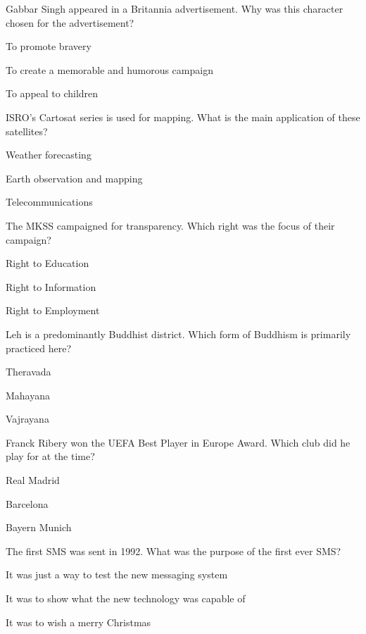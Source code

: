 \begin{enhancedmcq}{Gabbar Singh appeared in a Britannia advertisement. Why was this character chosen for the advertisement?}
\item To promote bravery
\item To create a memorable and humorous campaign
\item To appeal to children

\end{enhancedmcq}
\begin{enhancedmcq}{ISRO's Cartosat series is used for mapping. What is the main application of these satellites?}
\item Weather forecasting
\item Earth observation and mapping
\item Telecommunications

\end{enhancedmcq}
\begin{enhancedmcq}{The MKSS campaigned for transparency. Which right was the focus of their campaign?}
\item Right to Education
\item Right to Information
\item Right to Employment

\end{enhancedmcq}
\begin{enhancedmcq}{Leh is a predominantly Buddhist district. Which form of Buddhism is primarily practiced here?}
\item Theravada
\item Mahayana
\item Vajrayana

\end{enhancedmcq}
\begin{enhancedmcq}{Franck Ribery won the UEFA Best Player in Europe Award. Which club did he play for at the time?}
\item Real Madrid
\item Barcelona
\item Bayern Munich

\end{enhancedmcq}
\begin{enhancedmcq}{The first SMS was sent in 1992. What was the purpose of the first ever SMS?}
\item It was just a way to test the new messaging system
\item It was to show what the new technology was capable of
\item It was to wish a merry Christmas

\end{enhancedmcq}
